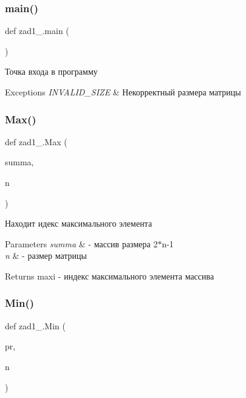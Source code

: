 \subsubsection{\texorpdfstring{main()}{main()}}
{\footnotesize\ttfamily def zad1\+\_.\+main (\begin{DoxyParamCaption}{ }\end{DoxyParamCaption})}



Точка входа в программу 


\begin{DoxyExceptions}{Exceptions}
{\em I\+N\+V\+A\+L\+I\+D\+\_\+\+S\+I\+ZE} & Некорректный размера матрицы \\
\hline
\end{DoxyExceptions}
\mbox{\label{namespacezad1__7_a6a71e5d3500d9d48fcb274d95e6bc7ef}} 
\subsubsection{\texorpdfstring{Max()}{Max()}}
{\footnotesize\ttfamily def zad1\+\_.\+Max (\begin{DoxyParamCaption}\item[{}]{summa,  }\item[{}]{n }\end{DoxyParamCaption})}



Находит идекс максимального элемента 


\begin{DoxyParams}{Parameters}
{\em summa} & -\/ массив размера 2$\ast$n-\/1 \\
\hline
{\em n} & -\/ размер матрицы \\
\hline
\end{DoxyParams}
\begin{DoxyReturn}{Returns}
maxi -\/ индекс максимального элемента массива 
\end{DoxyReturn}
\mbox{\label{namespacezad1__7_a4e23c099132e7637560c715410b80cb5}} 
\subsubsection{\texorpdfstring{Min()}{Min()}}
{\footnotesize\ttfamily def zad1\+\_.\+Min (\begin{DoxyParamCaption}\item[{}]{pr,  }\item[{}]{n }\end{DoxyParamCaption})}



